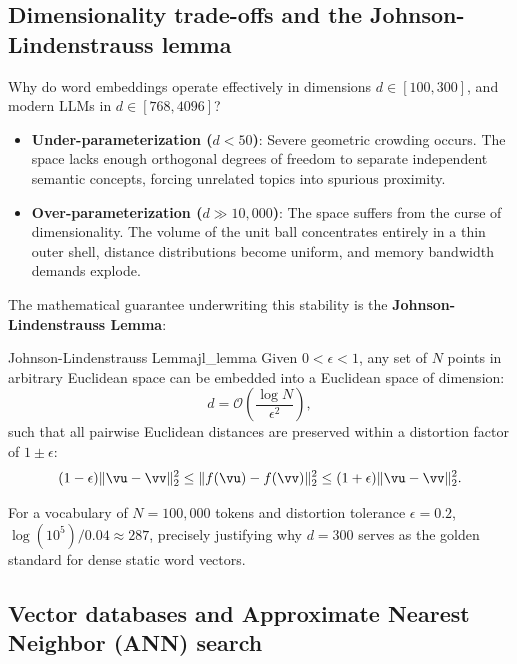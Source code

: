 \documentclass[../../main.tex]{subfiles}
\begin{document}
\subsection{Dimensionality trade-offs and the Johnson-Lindenstrauss lemma}
\label{subsec:johnson_lindenstrauss}

Why do word embeddings operate effectively in dimensions $d \in [100, 300]$, and modern LLMs in $d \in [768, 4096]$?
\begin{itemize}
    \item \textbf{Under-parameterization ($d < 50$)}: Severe geometric crowding occurs. The space lacks enough orthogonal degrees of freedom to separate independent semantic concepts, forcing unrelated topics into spurious proximity.
    \item \textbf{Over-parameterization ($d \gg 10{,}000$)}: The space suffers from the curse of dimensionality. The volume of the unit ball concentrates entirely in a thin outer shell, distance distributions become uniform, and memory bandwidth demands explode.
\end{itemize}

The mathematical guarantee underwriting this stability is the \textbf{Johnson-Lindenstrauss Lemma}:
\begin{theorem}{Johnson-Lindenstrauss Lemma}{jl_lemma}
Given $0 < \epsilon < 1$, any set of $N$ points in arbitrary Euclidean space can be embedded into a Euclidean space of dimension:
\begin{equation}
\label{eq:jl_dimension}
d = \mathcal{O}\left( \frac{\log N}{\epsilon^2} \right),
\end{equation}
such that all pairwise Euclidean distances are preserved within a distortion factor of $1 \pm \epsilon$:
\begin{equation}
\label{eq:jl_bound}
(1 - \epsilon) \|\vu - \vv\|_2^2 \le \|f(\vu) - f(\vv)\|_2^2 \le (1 + \epsilon) \|\vu - \vv\|_2^2.
\end{equation}
\end{theorem}
For a vocabulary of $N = 100{,}000$ tokens and distortion tolerance $\epsilon = 0.2$, $\log(10^5) / 0.04 \approx 287$, precisely justifying why $d = 300$ serves as the golden standard for dense static word vectors.

\subsection{Vector databases and Approximate Nearest Neighbor (ANN) search}
\label{subsec:vector_databases}
\end{document}
